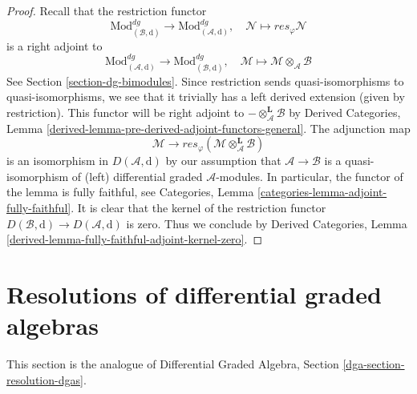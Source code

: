 \begin{proof}
Recall that the restriction functor
$$
\text{Mod}^{dg}_{(\mathcal{B}, \text{d})} \to
\text{Mod}^{dg}_{(\mathcal{A}, \text{d})},\quad
\mathcal{N} \mapsto res_\varphi \mathcal{N}
$$
is a right adjoint to
$$
\text{Mod}^{dg}_{(\mathcal{A}, \text{d})} \to
\text{Mod}^{dg}_{(\mathcal{B}, \text{d})},\quad
\mathcal{M} \mapsto \mathcal{M} \otimes_\mathcal{A} \mathcal{B}
$$
See Section \ref{section-dg-bimodules}. Since restriction
sends quasi-isomorphisms to quasi-isomorphisms, we see that
it trivially has a left derived extension (given by
restriction). This functor will be right adjoint to
$- \otimes_\mathcal{A}^\mathbf{L} \mathcal{B}$ by
Derived Categories, Lemma
\ref{derived-lemma-pre-derived-adjoint-functors-general}.
The adjunction map
$$
\mathcal{M} \to
res_\varphi(\mathcal{M} \otimes_\mathcal{A}^\mathbf{L} \mathcal{B})
$$
is an isomorphism in $D(\mathcal{A}, \text{d})$ by our assumption
that $\mathcal{A} \to \mathcal{B}$ is a quasi-isomorphism of
(left) differential graded $\mathcal{A}$-modules. In particular,
the functor of the lemma is fully faithful, see
Categories, Lemma \ref{categories-lemma-adjoint-fully-faithful}.
It is clear that the kernel of the restriction functor
$D(\mathcal{B}, \text{d}) \to D(\mathcal{A}, \text{d})$
is zero. Thus we conclude by Derived Categories, Lemma
\ref{derived-lemma-fully-faithful-adjoint-kernel-zero}.
\end{proof}













\section{Resolutions of differential graded algebras}
\label{section-resolution-dgas}

\noindent
This section is the analogue of
Differential Graded Algebra, Section \ref{dga-section-resolution-dgas}.

